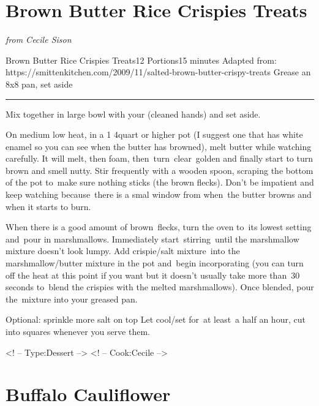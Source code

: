 \documentclass[openany]{book}
\begin{document}
\chapter{Brown Butter Rice Crispies
Treats}\label{brown-butter-rice-crispies-treats}

\emph{from Cecile Sison}

\begin{recipe}[BrownButterRiceCrispieTreats]{Brown Butter Rice Crispies Treats}{12 Portions}{15 minutes}
\freeform Adapted from: https://smittenkitchen.com/2009/11/salted-brown-butter-crispy-treats
\freeform Grease an 8x8 pan, set aside
\freeform\rule{\textwidth}{0.05pt}

Mix together in large bowl with your (cleaned hands) and set aside.

On medium low heat, in a 1 4quart or higher pot (I suggest one that has white enamel so you can see when the butter has browned), melt butter while watching carefully. It will melt, then foam, then turn clear golden and finally start to turn brown and smell nutty. Stir frequently with a wooden spoon, scraping the bottom of the pot to make sure nothing sticks (the brown flecks). Don't be impatient and keep watching because there is a smal window from when the butter browns and when it starts to burn. 

When there is a good amount of brown flecks, turn the oven to its lowest setting and pour in marshmallows. Immediately start stirring until the marshmallow mixture doesn't look lumpy.
Add crispie/salt mixture into the marshmallow/butter mixture in the pot and begin incorporating (you can turn off the heat at this point if you want but it doesn't usually take more than 30 seconds to blend the crispies with the melted marshmallows).
Once blended, pour the mixture into your greased pan.

\freeform Optional: sprinkle more salt on top
\freeform Let cool/set for at least a half an hour, cut into squares whenever you serve them.

\end{recipe}

\textless{}! -- Type:Dessert --\textgreater{} \textless{}! --
Cook:Cecile --\textgreater{}

\chapter{Buffalo Cauliflower}\label{buffalo-cauliflower}
\end{document}
